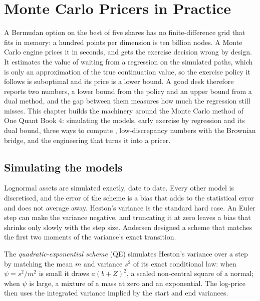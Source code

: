 \chapter{Monte Carlo Pricers in Practice}\label{ch:dv:monte-carlo-pricers-in-practice}

A Bermudan option on the best of five shares has no finite-difference grid that fits in memory: a hundred points per
dimension is ten billion nodes. A Monte Carlo engine prices it in seconds, and gets the exercise decision wrong by
design. It estimates the value of waiting from a regression on the simulated paths, which is only an approximation of
the true continuation value, so the exercise policy it follows is suboptimal and its price is a lower bound. A good desk
therefore reports two numbers, a lower bound from the policy and an upper bound from a dual method, and the gap between
them measures how much the regression still misses. This chapter builds the machinery around the Monte Carlo method of
One Quant Book 4: simulating the models, early exercise by regression and its dual bound, three ways to compute ,
low-discrepancy numbers with the Brownian bridge, and the engineering that turns it into a pricer.

\section{Simulating the models}

Lognormal assets are simulated exactly, date to date. Every other model is discretised, and the error of the scheme is a
bias that adds to the statistical error and does not average away. Heston's variance is the standard hard case. An Euler step
can make the variance negative, and truncating it at zero leaves a bias that shrinks only slowly with the step size. Andersen
designed a scheme that matches the first two moments of the variance's exact transition.

\begin{definition}\label{def:dv:monte-carlo-pricers-in-practice:qe}
The \emph{quadratic-exponential scheme} (QE) simulates Heston's variance over a step by matching
the mean $m$ and variance $s^2$ of its exact conditional law: when $\psi=s^2/m^2$ is small it draws $a(b+Z)^2$, a scaled
non-central square of a normal; when $\psi$ is large, a mixture of a mass at zero and an exponential. The log-price then uses the
integrated variance implied by the start and end variances.
\end{definition}

